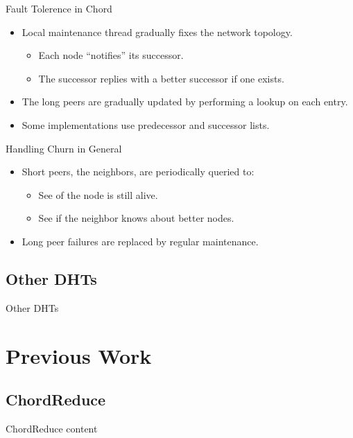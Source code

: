 \documentclass[11pt]{beamer}
\begin{document}
\begin{frame}{Fault Tolerence in Chord}
	\begin{itemize}
		\item Local maintenance thread  gradually fixes the network topology.
		\begin{itemize}
			\item Each node ``notifies'' its successor.
			\item The successor replies with a better successor if one exists.
		\end{itemize}
		\item The long peers are gradually updated by performing a lookup on each entry.
		\item Some implementations use predecessor and successor lists.
	\end{itemize}
\end{frame}



\begin{frame}{Handling Churn in General}
	\begin{itemize}
		\item Short peers, the neighbors, are periodically queried to:
		\begin{itemize}
			\item See of the node is still alive.
			\item See if the neighbor knows about better nodes.
		\end{itemize}
		\item Long peer failures are replaced by regular maintenance.
	\end{itemize}
\end{frame}


\subsection{Other DHTs}
\begin{frame}{Other DHTs}
\end{frame}

\section{Previous Work}

\subsection{ChordReduce}

\begin{frame}{ChordReduce}
	content
\end{frame}
\end{document}
